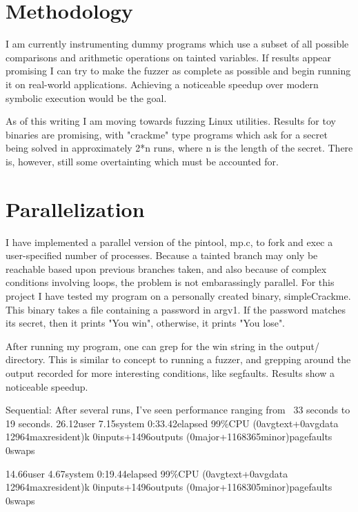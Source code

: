 \documentclass[11pt,expanded,copyright]{fsuthesis}
\begin{document}
\section{Methodology}

I am currently instrumenting dummy programs which use a subset of all possible comparisons and arithmetic operations on tainted variables. If results appear promising I can try to make the fuzzer as complete as possible and begin running it on real-world applications. Achieving a noticeable speedup over modern symbolic execution would be the goal.

As of this writing I am moving towards fuzzing Linux utilities. Results for toy binaries are promising, with "crackme" type programs which ask for a secret being solved in approximately 2*n runs, where n is the length of the secret. There is, however, still some overtainting which must be accounted for.	

\section{Parallelization}

I have implemented a parallel version of the pintool, mp.c, to fork and exec a user-specified number of processes. Because a tainted branch may only be reachable based upon previous branches taken, and also because of complex conditions involving loops, the problem is not embarassingly parallel. For this project I have tested my program on a personally created binary, simpleCrackme. This binary takes a file containing a password in argv1. If the password matches its secret, then it prints "You win", otherwise, it prints "You lose". 

After running my program, one can grep for the win string in the output/ directory. This is similar to concept to running a fuzzer, and grepping around the output recorded for more interesting conditions, like segfaults. Results show a noticeable speedup.

Sequential:
After several runs, I've seen performance ranging from ~33 seconds to 19 seconds.
26.12user 7.15system 0:33.42elapsed 99\%CPU (0avgtext+0avgdata 12964maxresident)k
0inputs+1496outputs (0major+1168365minor)pagefaults 0swaps

14.66user 4.67system 0:19.44elapsed 99\%CPU (0avgtext+0avgdata 12964maxresident)k
0inputs+1496outputs (0major+1168305minor)pagefaults 0swaps
\end{document}
